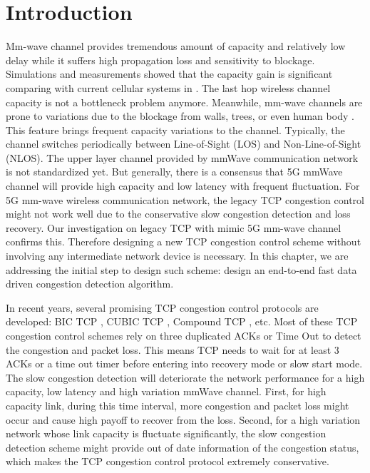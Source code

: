 \section{Introduction}
\par  Mm-wave channel provides tremendous amount of capacity and relatively low delay while it suffers high propagation loss and sensitivity to blockage. Simulations and measurements showed that the capacity gain is significant comparing with current cellular systems in \cite{akdeniz2014millimeter,bai2015coverage}. The last hop wireless channel capacity is not a bottleneck problem anymore. Meanwhile, mm-wave channels are prone to variations due to the blockage from walls, trees, or even human body \cite{lu2012modeling, zhao201328, alejos2008measurement}. This feature brings frequent capacity variations to the channel. Typically, the channel switches periodically between Line-of-Sight (LOS) and Non-Line-of-Sight (NLOS). The upper layer channel provided by mmWave communication network is not standardized yet. But generally, there is a consensus that 5G mmWave channel will provide high capacity and low latency with frequent fluctuation. For 5G mm-wave wireless communication network, the legacy TCP congestion control might not work well due to the conservative slow congestion detection and loss recovery. Our investigation on legacy TCP with mimic 5G mm-wave channel confirms this. Therefore designing a new TCP congestion control scheme without involving any intermediate network device is necessary. In this chapter, we are addressing the initial step to design such scheme: design an end-to-end fast data driven congestion detection algorithm.
\par In recent years, several promising TCP congestion control protocols are developed: BIC TCP \cite{xu2004binary}, CUBIC TCP \cite{ha2008cubic}, Compound TCP \cite{tan2006compound}, etc. Most of these TCP congestion control schemes rely on three duplicated ACKs or Time Out to detect the congestion and packet loss. This means TCP needs to wait for at least 3 ACKs or a time out timer before entering into recovery mode or slow start mode. The slow congestion detection will deteriorate the network performance for a high capacity, low latency and high variation mmWave channel. First, for high capacity link, during this time interval, more congestion and packet loss might occur and cause high payoff to recover from the loss. Second, for a high variation network whose link capacity is fluctuate significantly, the slow congestion detection scheme might provide out of date information of the congestion status, which makes the TCP congestion control protocol extremely conservative.

